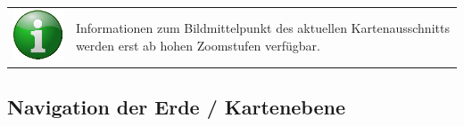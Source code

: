 \documentclass[10pt]{scrreprt}
\begin{document}
\vspace{3mm}
\begin{tabular}{>{\centering \arraybackslash}m{1cm} m{14cm}}
\includegraphics[scale=0.5]{images/info.eps} & Informationen zum Bildmittelpunkt des aktuellen Kartenausschnitts werden erst ab hohen Zoomstufen verfügbar.
\end{tabular}




\newpage
\subsection{Navigation der Erde / Kartenebene} 

\vspace{3mm}
\end{document}
